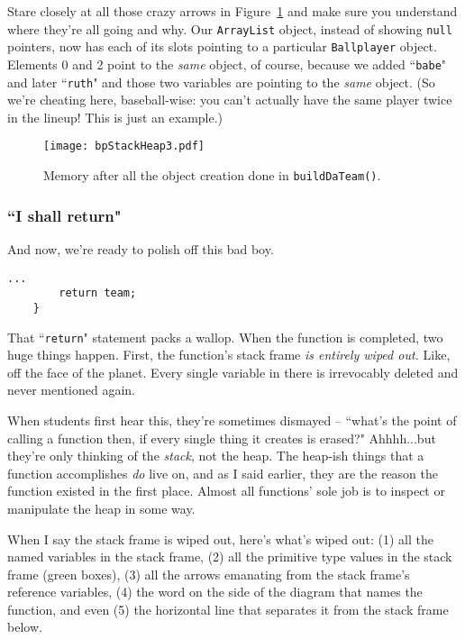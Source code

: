 Stare closely at all those crazy arrows in Figure~\ref{fig:bpStackHeap3} and
make sure you understand where they're all going and why. Our
\texttt{ArrayList} object, instead of showing \texttt{null} pointers, now has
each of its slots pointing to a particular \texttt{Ballplayer} object.
Elements 0 and 2 point to the \textit{same} object, of course, because we
added ``\texttt{babe}" and later ``\texttt{ruth}" and those two variables are
pointing to the \textit{same} object. (So we're cheating here, baseball-wise:
you can't actually have the same player twice in the lineup! This is just an
example.)

\begin{figure}[ht]   %
\centering
\texttt{[image: bpStackHeap3.pdf]}
\caption{Memory after all the object creation done in \texttt{buildDaTeam()}.}
\label{fig:bpStackHeap3}
\end{figure}

\subsubsection{``I shall return"}

And now, we're ready to polish off this bad boy.

\begin{Verbatim}[fontsize=\small,samepage=true,frame=single]
        ...
        return team;
    }
\end{Verbatim}


That ``\texttt{return}" statement packs a wallop. When the function is
completed, two huge things happen. First, the function's stack frame
\textit{is entirely wiped out.} Like, off the face of the planet. Every single
variable in there is irrevocably deleted and never mentioned again.

When students first hear this, they're sometimes dismayed -- ``what's the
point of calling a function then, if every single thing it creates is erased?"
Ahhhh...but they're only thinking of the \textit{stack}, not the heap. The
heap-ish things that a function accomplishes \textit{do} live on, and as I
said earlier, they are the reason the function existed in the first place.
Almost all functions' sole job is to inspect or manipulate the heap in some
way.

When I say the stack frame is wiped out, here's what's wiped out: (1) all the
named variables in the stack frame, (2) all the primitive type values in the
stack frame (green boxes), (3) all the arrows emanating from the stack frame's
reference variables, (4) the word on the side of the diagram that names the
function, and even (5) the horizontal line that separates it from the stack
frame below.

